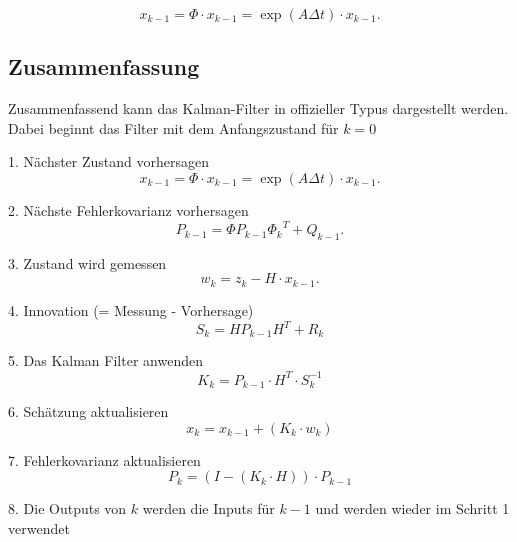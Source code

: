\[ 
{x_{k-1}}=\Phi \cdot {x_{k-1}}= \exp(A\Delta t)\cdot{x_{k-1}}.
 \] 


\subsection{Zusammenfassung }
Zusammenfassend kann das Kalman-Filter in offizieller Typus dargestellt werden. 
Dabei beginnt das Filter mit dem Anfangszustand für $k=0$

1. Nächster Zustand vorhersagen
\[{x_{k-1}}={\Phi} \cdot {x_{k-1}}= \exp(A\Delta t)\cdot{x_{k-1}}.\] 

2. Nächste Fehlerkovarianz vorhersagen
\[{P_{k-1}}={\Phi} {P_{k-1}} {\Phi _{k}}^T + {Q_{k-1}}.\] 

3. Zustand wird gemessen
\[{w_{k}}={z_{k}}-{H}\cdot{x_{k-1}}.\] 

4. Innovation (= Messung -  Vorhersage)
\[ {S_{k}}={H}{P_{k-1}}{H}^T+{R_{k}}\] 

5. Das Kalman Filter anwenden
\[{K_{k}}= {P_{k-1}} \cdot {H^T}\cdot {S_{k}^{-1}}\] 

6. Schätzung aktualisieren
\[{x_{k}}={x_{k-1}}+({K_{k}}\cdot {w_{k}}) \] 

7. Fehlerkovarianz aktualisieren
\[{P_{k}}=(I-({K_{k}}\cdot {H})) \cdot {P_{k-1}} \] 

8. Die Outputs von $k$ werden die Inputs für ${k-1}$ und werden wieder im Schritt 1 verwendet


